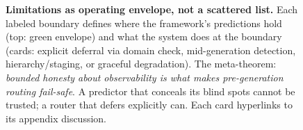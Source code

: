 \begin{figure}[!htb]
\caption{\textbf{Limitations as operating envelope, not a scattered list.} Each labeled boundary defines where the framework's predictions hold (top: green envelope) and what the system does at the boundary (cards: explicit deferral via domain check, mid-generation detection, hierarchy/staging, or graceful degradation). The meta-theorem: \emph{bounded honesty about observability is what makes pre-generation routing fail-safe}. A predictor that conceals its blind spots cannot be trusted; a router that defers explicitly can. Each card hyperlinks to its appendix discussion.}
\label{fig:limitations_envelope}
\end{figure}
